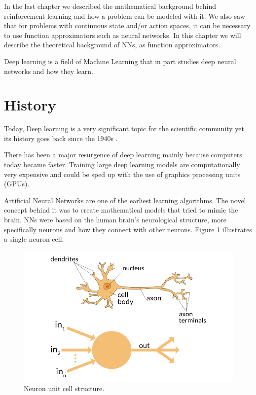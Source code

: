 In the last chapter we described the mathematical background behind reinforcement learning and how a problem can be modeled with it.
We also saw that for problems with continuous state and/or action spaces, it can be necessary to use function approximators such as
neural networks. 
In this chapter we  will describe the theoretical background of NNs, as function approximators.

Deep learning is a field of Machine Learning that in part studies deep neural networks and how they learn. 

\section{History}
Today, Deep learning is a very significant topic for the scientific community yet its history goes back since the 1940s \cite{DeepLearningBook}.

There has been a major resurgence of deep learning mainly because computers today became faster.
Training large deep learning models are computationally very expensive and could be sped up with the use
of graphics processing units (GPUs).

Artificial Neural Networks are one of the earliest learning algorithms. The novel concept behind it was to 
create mathematical models that tried to mimic the brain.
NNs were based on the human brain's neurological structure, more specifically neurons and how they connect with other neurons.
Figure \ref{fig:neuron} illustrates a single neuron cell.

\begin{figure}
    \centering
    \includegraphics[width=1\textwidth]{Chapter3/neuron.png}
    \caption{Neuron unit cell structure.}
    \label{fig:neuron}
\end{figure}

